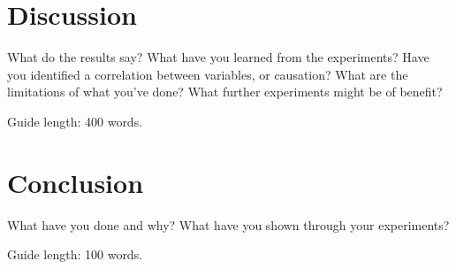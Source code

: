 \documentclass{csfourzero}
\begin{document}
\section{Discussion}
\label{sec:discuss}

What do the results say? What have you learned from the
experiments? Have you identified a correlation between variables, or
causation? What are the limitations of what you've done? What further
experiments might be of benefit?

Guide length: 400 words.

\section{Conclusion}
\label{sec:conc}

What have you done and why? What have you shown through your
experiments?

Guide length: 100 words.


\end{document}
